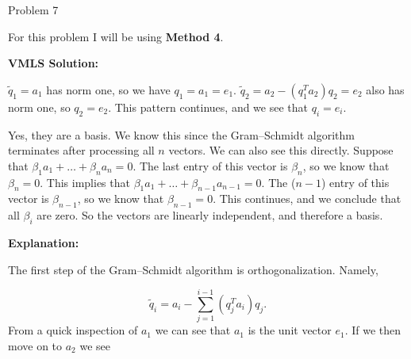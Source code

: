 \begin{problem}{Problem 7}
    \begin{highlight}[Solution]
        For this problem I will be using \textbf{Method 4}. \vspace*{1em}

        \textbf{VMLS Solution:} \vspace*{1em}

        $\tilde{q}_{1} = a_{1}$ has norm one, so we have $q_{1} = a_{1} = e_{1}$. $\tilde{q}_{2} = a_{2} - (q_{1}^{T}a_{2})q_{2} = e_{2}$ also has norm one, so $q_{2} = e_{2}$. This pattern continues,
        and we see that $q_{i} = e_{i}$.

        Yes, they are a basis. We know this since the Gram–Schmidt algorithm terminates after processing all $n$ vectors. We can also see this directly. Suppose that $\beta_{1}a_{1} + \dots + 
        \beta_{n}a_{n} = 0$. The last entry of this vector is $\beta_{n}$, so we know that $\beta_{n} = 0$. This implies that $\beta_{1}a_{1} + \dots + \beta_{n - 1}a_{n - 1} = 0$. The ($n - 1$) entry
        of this vector is $\beta_{n - 1}$, so we know that $\beta_{n - 1} = 0$. This continues, and we conclude that all $\beta_{i}$ are zero. So the vectors are linearly independent, and therefore a basis. \vspace*{1em}

        \textbf{Explanation:} \vspace*{1em}

        The first step of the Gram–Schmidt algorithm is orthogonalization. Namely,

        \setcounter{equation}{0}
        \begin{equation}
            \tilde{q}_{i} = a_{i} - \sum_{j = 1}^{i - 1} (q_{j}^{T}a_{i})q_{j}.
        \end{equation}
        From a quick inspection of $a_{1}$ we can see that $a_{1}$ is the unit vector $e_{1}$. If we then move on to $a_{2}$ we see


\end{highlight}
\end{problem}
